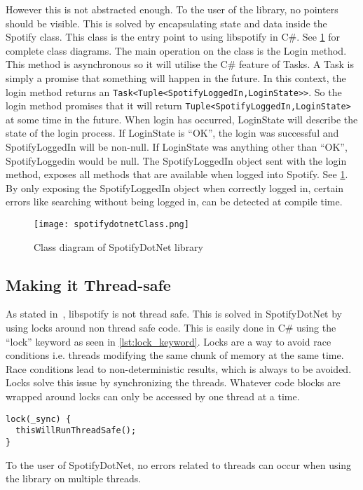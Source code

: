 However this is not abstracted enough. To the user of the library, no pointers should be visible. This is solved by encapsulating state and data inside the Spotify class. This class is the entry point to using libspotify in C\#. See \cref{fig:spotifydotnet_class} for complete class diagrams. The main operation on the class is the Login method. This method is asynchronous so it will utilise the C\# feature of Tasks. A Task is simply a promise that something will happen in the future. In this context, the login method returns an \lstinline|Task<Tuple<SpotifyLoggedIn,LoginState>>|. So the login method promises that it will return \lstinline|Tuple<SpotifyLoggedIn,LoginState>| at some time in the future. When login has occurred, LoginState will describe the state of the login process. If LoginState is \enquote{OK}, the login was successful and SpotifyLoggedIn will be non-null. If LoginState was anything other than \enquote{OK}, SpotifyLoggedin would be null. The SpotifyLoggedIn object sent with the login method, exposes all methods that are available when logged into Spotify. See \cref{fig:spotifydotnet_class}. By only exposing the SpotifyLoggedIn object when correctly logged in, certain errors like searching without being logged in, can be detected at compile time.

\begin{figure}[hbtp]
  \centering
  \texttt{[image: spotifydotnetClass.png]}
  \caption{Class diagram of SpotifyDotNet library}
  \label{fig:spotifydotnet_class}
\end{figure}

\subsection{Making it Thread-safe}
\label{libspotify:making_it_thread_safe}

As stated in~\cite{spotifyLibspotifyFAQ}, libspotify is not thread safe. This is solved in SpotifyDotNet by using locks around non thread safe code. This is easily done in C\# using the \enquote{lock} keyword as seen in \cref{lst:lock_keyword}. Locks are a way to avoid race conditions i.e. threads modifying the same chunk of memory at the same time. Race conditions lead to non-deterministic results, which is always to be avoided. Locks solve this issue by synchronizing the threads. Whatever code blocks are wrapped around locks can only be accessed by one thread at a time.

\begin{lstlisting}[caption = {Example of using the lock keyword in C\#. \enquote{\_sync} is an object used to store the lock state}, label = {lst:lock_keyword}]
lock(_sync) {
  thisWillRunThreadSafe();
}
\end{lstlisting}

To the user of SpotifyDotNet, no errors related to threads can occur when using the library on multiple threads.
